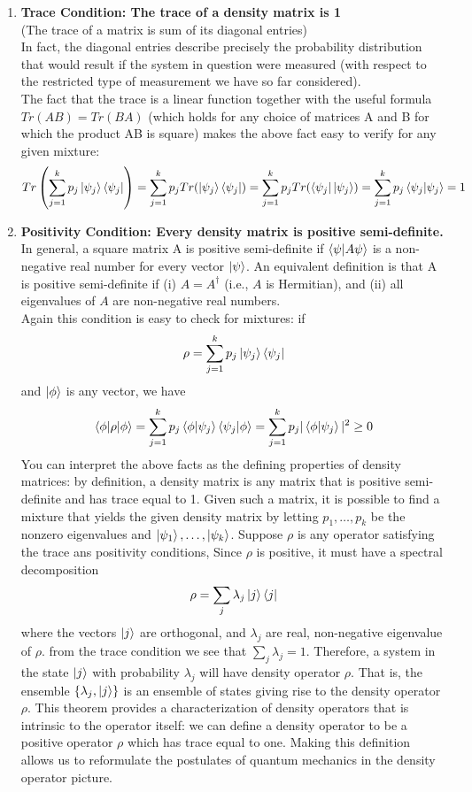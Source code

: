 \documentclass[12pt, oneside]{book}
\theoremstyle{definition}
\theoremstyle{definition}
\theoremstyle{remark}
\begin{document}
\begin{enumerate}
    \item \textbf{Trace Condition: The trace of a density matrix is 1}\\
    (The trace of a matrix is sum of its diagonal entries)\\
    In fact, the diagonal entries describe precisely the probability distribution that would result if the system in question were measured (with respect to the restricted type of measurement we have so far considered).\\
    The fact that the trace is a linear function together with the useful formula $Tr(AB)=Tr(BA)$ (which holds for any choice of matrices A and B for which the product AB is square) makes the above fact easy to verify for any given mixture:
    \[
    Tr\left(\sum_{j=1}^k p_j\ket{\psi_j}\bra{\psi_j}\right)=\sum_{j=1}^k p_jTr(\ket{\psi_j}\bra{\psi_j})  = \sum_{j=1}^k p_j Tr(\bra{\psi_j}\ket{\psi_j}) = \sum_{j=1}^k p_j\braket{\psi_j|\psi_j} = 1
    \]
    \item \textbf{Positivity Condition: Every density matrix is positive semi-definite.}\\
    In general, a square matrix A is positive semi-definite if $\braket{\psi|A\psi}$ is a non-negative real number for every vector $\ket{\psi}$. An equivalent definition is that A is positive semi-definite if (i) $A=A^{\dagger}$ (i.e., $A$ is Hermitian), and (ii) all eigenvalues of $A$ are non-negative real numbers.\\
    Again this condition is easy to check for mixtures: if
    \[
    \rho=\sum_{j=1}^k p_j \ket{\psi_j}\bra{\psi_j}
    \]
    and $\ket{\phi}$ is any vector, we have
    \[
    \braket{\phi|\rho|\phi} = \sum_{j=1}^k p_j\braket{\phi|\psi_j} \braket{\psi_j|\phi}=\sum_{j=1}^k p_j|\braket{\phi|\psi_j}|^2 \geq 0
    \]
    You can interpret the above facts as the defining properties of density matrices: by definition, a density matrix is any matrix that is positive semi-definite and has trace equal to 1. Given such a matrix, it is possible to find a mixture that yields the given density matrix by letting $p_1,\ldots,p_k$ be the nonzero eigenvalues and $\ket{\psi_1},\ldots, \ket{\psi_k}$. Suppose $\rho$ is any operator satisfying the trace ans positivity conditions, Since $\rho$ is positive, it must have a spectral decomposition
    \[
    \rho=\sum_j\lambda_j\ket{j}\bra{j}
    \]
    where the vectors $\ket{j}$ are orthogonal, and $\lambda_j$ are real, non-negative eigenvalue of $\rho$. from the trace condition we see that $\sum_j\lambda_j=1$. Therefore, a system in the state $\ket{j}$ with probability $\lambda_j$ will have density operator $\rho$. That is, the ensemble $\{\lambda_j,\ket{j}\}$ is an ensemble of states giving rise to the density operator $\rho$. This theorem provides a characterization of density operators that is intrinsic to the operator itself: we can define a density operator to be a positive operator $\rho$ which has trace equal to one. Making this definition allows us to reformulate the postulates of quantum mechanics in the density operator picture.
\end{enumerate}
\end{document}
